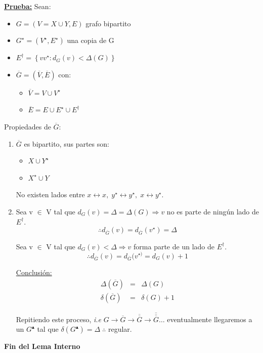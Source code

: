 \documentclass[12pt,a4paper]{report}
\begin{document}
				\underline{\textbf{Prueba:}} Sean:
					\begin{itemize}
						\item $G = (V = X \cup Y, E)$ grafo bipartito
						\item $G^{\star} = (V^{\star}, E^{\star})$ una copia de G
						\item $E^{\dag} = \left\lbrace vv^{\star} : d_{G}(v) < \Delta(G) \right\rbrace$
						\item $\overline{G} = (\overline{V}, \overline{E})$ con:
							\begin{itemize}
								\item $\overline{V} = V \cup V^{\star}$
								\item $\overline{E} = E \cup E^{\star} \cup E^{\dag}$
							\end{itemize}
					\end{itemize}

					\par Propiedades de $\overline{G}$:
					\begin{enumerate}
						\item $\overline{G}$ es bipartito, sus partes son:
							\begin{itemize}
								\item $X \cup Y^{\star}$
								\item $X^{\star} \cup Y$
							\end{itemize}
							\par No existen lados entre $x \leftrightarrow x, \; y^{\star} \leftrightarrow y^{\star}, \; x \leftrightarrow y^{\star}$.

						\item Sea v $\in$ V tal que $d_{G}(v) = \Delta = \Delta(G) \Rightarrow v$ no es parte de ningún lado de $E^{\dag}$.
							\[
								\therefore d_{\overline{G}}(v) = d_{\overline{G}}(v^{\star}) = \Delta
							\]

							\vspace{5mm}
							\par Sea v $\in$ V tal que $d_{G}(v) < \Delta \Rightarrow v$ forma parte de un lado de $E^{\dag}$.
							\[
								\therefore d_{\overline{G}}(v) = d_{\overline{G}}(v^{\star)} = d_{G}(v) + 1
							\]
							
							\vspace{5mm}
							\par \underline{Conclusión:}
							\begin{eqnarray}
								\nonumber \Delta(\overline{G}) &=& \Delta(G) \\
								\nonumber \delta(\overline{G}) &=& \delta(G) + 1
							\end{eqnarray}
							\par Repitiendo este proceso, \textit{i.e} $G \rightarrow \overline{G} \rightarrow \overline{\overline{G}} \rightarrow \overline{\overline{\overline{G}}} \dotsc $ eventualmente llegaremos a un $G^{\blacktriangle}$ tal que $\delta(G^{\blacktriangle}) = \Delta \; \therefore $ regular.
					\end{enumerate}
			\par 	\textbf{Fin del Lema Interno}
\end{document}
